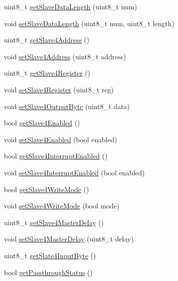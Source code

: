 \begin{DoxyCompactItemize}
\item 
uint8\+\_\+t \hyperlink{classMPU6050_a54c2a48b3cb79106bcaf75accf6cd311}{get\+Slave\+Data\+Length} (uint8\+\_\+t num)
\item 
void \hyperlink{classMPU6050_ab4151353f433c533246d938fc3b78458}{set\+Slave\+Data\+Length} (uint8\+\_\+t num, uint8\+\_\+t length)
\item 
uint8\+\_\+t \hyperlink{classMPU6050_a4278dec5fec25be9a6f45b51a3373ad2}{get\+Slave4\+Address} ()
\item 
void \hyperlink{classMPU6050_a6985da2cbc37be3fefbe3c16bf8d34a6}{set\+Slave4\+Address} (uint8\+\_\+t address)
\item 
uint8\+\_\+t \hyperlink{classMPU6050_a7bd548cb60ecceb27c72f026ec0a60f8}{get\+Slave4\+Register} ()
\item 
void \hyperlink{classMPU6050_ae54dc358da048e61a1ac68012300fdaa}{set\+Slave4\+Register} (uint8\+\_\+t reg)
\item 
void \hyperlink{classMPU6050_a17147a6f477be79f58889e9e6329392f}{set\+Slave4\+Output\+Byte} (uint8\+\_\+t data)
\item 
bool \hyperlink{classMPU6050_a4b9e13d6776ba99e042773873557bedd}{get\+Slave4\+Enabled} ()
\item 
void \hyperlink{classMPU6050_a04be2a8c3af6ef174f97769b9b5164a9}{set\+Slave4\+Enabled} (bool enabled)
\item 
bool \hyperlink{classMPU6050_a051549bcfa2eeb848c8557fc3efe74da}{get\+Slave4\+Interrupt\+Enabled} ()
\item 
void \hyperlink{classMPU6050_a7d7498ebc26f8a1fe8c9dcf40cd5d265}{set\+Slave4\+Interrupt\+Enabled} (bool enabled)
\item 
bool \hyperlink{classMPU6050_a8d5a5e73907c78960154b92656127372}{get\+Slave4\+Write\+Mode} ()
\item 
void \hyperlink{classMPU6050_af1402fe7f3e1cc0dedb6714351cbca4e}{set\+Slave4\+Write\+Mode} (bool mode)
\item 
uint8\+\_\+t \hyperlink{classMPU6050_a9a4585b3c9e61478db198011107a56a9}{get\+Slave4\+Master\+Delay} ()
\item 
void \hyperlink{classMPU6050_ac154934a43c599cdc564fb29c22c45eb}{set\+Slave4\+Master\+Delay} (uint8\+\_\+t delay)
\item 
uint8\+\_\+t \hyperlink{classMPU6050_a9bc93f34bc3d85cbe6010b4a3a88c5a7}{get\+Slate4\+Input\+Byte} ()
\item 
bool \hyperlink{classMPU6050_af2820067b73f177d985ed81e894281b0}{get\+Passthrough\+Status} ()
\item 

\end{DoxyCompactItemize}
